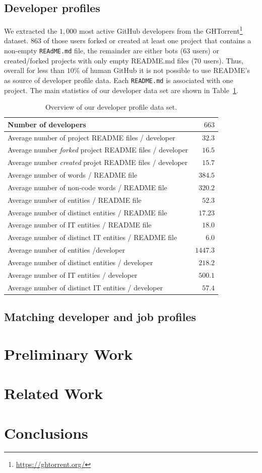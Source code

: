 \documentclass[conference]{IEEEtran}
\begin{document}
\subsection{Developer profiles}

We extracted the $1,000$ most active GitHub developers from the GHTorrent\footnote{\url{https://ghtorrent.org/}} dataset. 863 of those users forked or created at least one project that contains a non-empty \texttt{REAdME.md} file, the remainder are either bots (63 users) or created/forked projects with only empty README.md files (70 users). Thus, overall for less than $10\%$ of human GitHub it is not possible to use README's as source of developer profile data. Each \texttt{README.md} is associated with one project. The main statistics of our developer data set are shown in Table~\ref{tab:developers}. 


\begin{table}[htb]
\centering
\begin{tabular}{lr}
\toprule
Number of developers									& $663$\\
\midrule
Average number of project README files / developer	& $32.3$\\
Average number \emph{forked} project README files / developer	& $16.5$\\
Average number \emph{created} projet README files / developer & $15.7$\\
\midrule
Average number of words / README file		& $384.5$\\
Average number of non-code words / README file 	& $320.2$\\
\midrule
Average number of entities / README file 					& $52.3$\\
Average number of distinct entities / README file 					& $17.23$\\
\midrule
Average number of IT entities / README file				& $18.0$\\
Average number of distinct IT entities / README file				& $6.0$\\
\midrule
Average number of entities /developer						& $1447.3$\\
Average number of distinct entities / developer					& $218.2$\\
Average number of IT entities / developer			& $500.1$\\
Average number of distinct IT entities / developer				& $57.4$\\
\bottomrule
\end{tabular}
\caption{Overview of our developer profile data set.}
\label{tab:developers}
\end{table}


\subsection{Matching developer and job profiles}


\section{Preliminary Work}

\section{Related Work}

\section{Conclusions}



\end{document}
